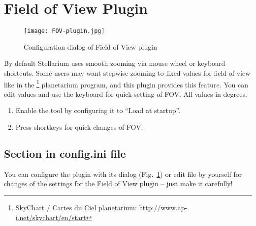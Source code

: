 \newpage

\section{Field of View Plugin}
\label{sec:plugins:FieldOfView}

\begin{figure}[ht]\centering
\texttt{[image: FOV-plugin.jpg]}
\caption{Configuration dialog of Field of View plugin}
\label{fig:plugins:FieldOfView}
\end{figure}

\noindent By default Stellarium uses smooth zooming via mouse wheel or
keyboard shortcuts. Some users may want stepwise zooming to fixed
values for field of view like in the \footnote{SkyChart / Cartes du Ciel planetarium:
  \url{http://www.ap-i.net/skychart/en/start}} planetarium program,
and this plugin provides this feature. You can edit values and use the
keyboard for quick-setting of FOV. All values in degrees.


\begin{enumerate}
\item Enable the tool by configuring it to ``Load at startup''.
\item Press shortkeys for quick changes of FOV.
\end{enumerate}

\subsection{Section  in config.ini file}
\label{sec:plugins:FieldOfView:config}

You can configure the plugin with its dialog (Fig.~\ref{fig:plugins:FieldOfView}) or edit
 file by yourself for changes of the settings for the
Field of View plugin -- just make it carefully!

